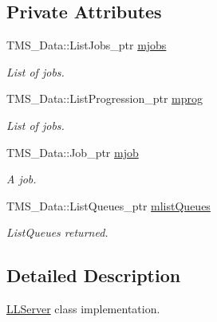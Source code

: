 \subsection*{Private Attributes}
\begin{DoxyCompactItemize}
\item 
\hypertarget{classLLServer_afba52bcf9ad47512b46a73a7ebe36cfc}{
TMS\_\-Data::ListJobs\_\-ptr \hyperlink{classLLServer_afba52bcf9ad47512b46a73a7ebe36cfc}{mjobs}}
\label{classLLServer_afba52bcf9ad47512b46a73a7ebe36cfc}

\begin{DoxyCompactList}\small\item\em List of jobs. \item\end{DoxyCompactList}\item 
\hypertarget{classLLServer_a0756372870c0be85949368d358e120e4}{
TMS\_\-Data::ListProgression\_\-ptr \hyperlink{classLLServer_a0756372870c0be85949368d358e120e4}{mprog}}
\label{classLLServer_a0756372870c0be85949368d358e120e4}

\begin{DoxyCompactList}\small\item\em List of jobs. \item\end{DoxyCompactList}\item 
\hypertarget{classLLServer_ad1575c813b96677e2a8cf26bd42816a9}{
TMS\_\-Data::Job\_\-ptr \hyperlink{classLLServer_ad1575c813b96677e2a8cf26bd42816a9}{mjob}}
\label{classLLServer_ad1575c813b96677e2a8cf26bd42816a9}

\begin{DoxyCompactList}\small\item\em A job. \item\end{DoxyCompactList}\item 
\hypertarget{classLLServer_a753c355ca93eb090880be918d1b54bf6}{
TMS\_\-Data::ListQueues\_\-ptr \hyperlink{classLLServer_a753c355ca93eb090880be918d1b54bf6}{mlistQueues}}
\label{classLLServer_a753c355ca93eb090880be918d1b54bf6}

\begin{DoxyCompactList}\small\item\em ListQueues returned. \item\end{DoxyCompactList}\end{DoxyCompactItemize}


\subsection{Detailed Description}
\hyperlink{classLLServer}{LLServer} class implementation. 

